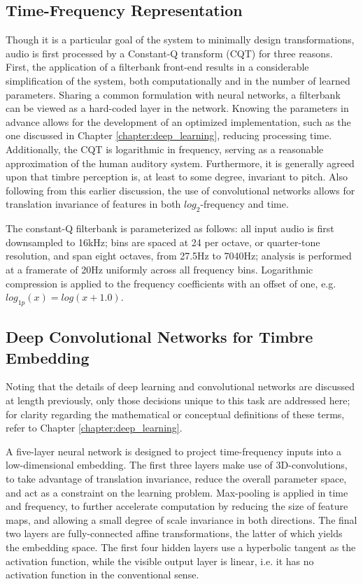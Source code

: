 \subsection{Time-Frequency Representation}
\label{subsec:timbre_tfr}

Though it is a particular goal of the system to minimally design transformations, audio is first processed by a Constant-Q transform (CQT) for three reasons.
First, the application of a filterbank front-end results in a considerable simplification of the system, both computationally and in the number of learned parameters.
Sharing a common formulation with neural networks, a filterbank can be viewed as a hard-coded layer in the network.
Knowing the parameters in advance allows for the development of an optimized implementation, such as the one discussed in Chapter \ref{chapter:deep_learning}, reducing processing time.
Additionally, the CQT is logarithmic in frequency, serving as a reasonable approximation of the human auditory system.
Furthermore, it is generally agreed upon that timbre perception is, at least to some degree, invariant to pitch.
Also following from this earlier discussion, the use of convolutional networks allows for translation invariance of features in both $log_2$-frequency and time.

The constant-Q filterbank is parameterized as follows: all input audio is first downsampled to 16kHz; bins are spaced at 24 per octave, or quarter-tone resolution, and span eight octaves, from 27.5Hz to 7040Hz; analysis is performed at a framerate of 20Hz uniformly across all frequency bins.
Logarithmic compression is applied to the frequency coefficients with an offset of one, e.g. $log_{1p}(x) = log(x + 1.0)$.


\subsection{Deep Convolutional Networks for Timbre Embedding}
\label{subsec:timbre_deepnet}

Noting that the details of deep learning and convolutional networks are discussed at length previously, only those decisions unique to this task are addressed here; for clarity regarding the mathematical or conceptual definitions of these terms, refer to Chapter \ref{chapter:deep_learning}.

A five-layer neural network is designed to project time-frequency inputs into a low-dimensional embedding.
The first three layers make use of 3D-convolutions, to take advantage of translation invariance, reduce the overall parameter space, and act as a constraint on the learning problem.
Max-pooling is applied in time and frequency, to further accelerate computation by reducing the size of feature maps, and allowing a small degree of scale invariance in both directions.
The final two layers are fully-connected affine transformations, the latter of which yields the embedding space.
The first four hidden layers use a hyperbolic tangent as the activation function, while the visible output layer is linear, i.e. it has no activation function in the conventional sense.

